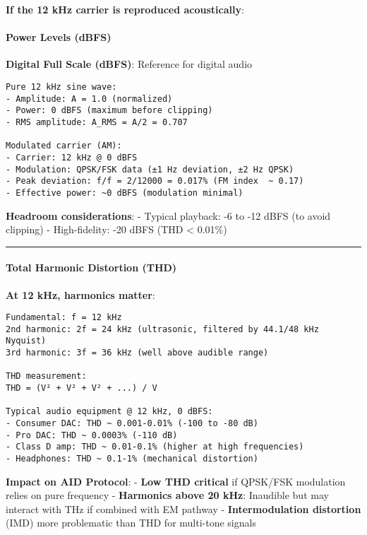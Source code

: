 \textbf{If the 12 kHz carrier is reproduced acoustically}:

\paragraph{Power Levels (dBFS)}\label{power-levels-dbfs}

\textbf{Digital Full Scale (dBFS)}: Reference for digital audio

\begin{verbatim}
Pure 12 kHz sine wave:
- Amplitude: A = 1.0 (normalized)
- Power: 0 dBFS (maximum before clipping)
- RMS amplitude: A_RMS = A/2 = 0.707

Modulated carrier (AM):
- Carrier: 12 kHz @ 0 dBFS
- Modulation: QPSK/FSK data (±1 Hz deviation, ±2 Hz QPSK)
- Peak deviation: f/f = 2/12000 = 0.017% (FM index  ~ 0.17)
- Effective power: ~0 dBFS (modulation minimal)
\end{verbatim}

\textbf{Headroom considerations}: - Typical playback: -6 to -12 dBFS (to
avoid clipping) - High-fidelity: -20 dBFS (THD \textless{} 0.01\%)

\begin{center}\rule{0.5\linewidth}{0.5pt}\end{center}

\paragraph{Total Harmonic Distortion
(THD)}\label{total-harmonic-distortion-thd}

\textbf{At 12 kHz, harmonics matter}:

\begin{verbatim}
Fundamental: f = 12 kHz
2nd harmonic: 2f = 24 kHz (ultrasonic, filtered by 44.1/48 kHz Nyquist)
3rd harmonic: 3f = 36 kHz (well above audible range)

THD measurement:
THD = (V² + V² + V² + ...) / V

Typical audio equipment @ 12 kHz, 0 dBFS:
- Consumer DAC: THD ~ 0.001-0.01% (-100 to -80 dB)
- Pro DAC: THD ~ 0.0003% (-110 dB)
- Class D amp: THD ~ 0.01-0.1% (higher at high frequencies)
- Headphones: THD ~ 0.1-1% (mechanical distortion)
\end{verbatim}

\textbf{Impact on AID Protocol}: - \textbf{Low THD critical} if QPSK/FSK
modulation relies on pure frequency - \textbf{Harmonics above 20 kHz}:
Inaudible but may interact with THz if combined with EM pathway -
\textbf{Intermodulation distortion} (IMD) more problematic than THD for
multi-tone signals

